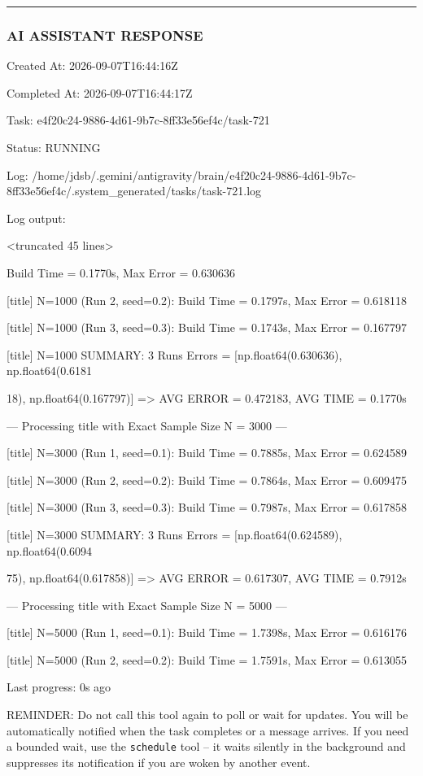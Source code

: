 \documentclass[11pt,a4paper]{article}
\begin{document}
\hrule

\subsubsection{AI ASSISTANT RESPONSE}

Created At: 2026-09-07T16:44:16Z

Completed At: 2026-09-07T16:44:17Z

Task: e4f20c24-9886-4d61-9b7c-8ff33e56ef4c/task-721

Status: RUNNING

Log: /home/jdsb/.gemini/antigravity/brain/e4f20c24-9886-4d61-9b7c-8ff33e56ef4c/.system\_generated/tasks/task-721.log

Log output:

<truncated 45 lines>

Build Time = 0.1770s, Max Error = 0.630636

[title] N=1000 (Run 2, seed=0.2): Build Time = 0.1797s, Max Error = 0.618118

[title] N=1000 (Run 3, seed=0.3): Build Time = 0.1743s, Max Error = 0.167797

[title] N=1000 SUMMARY: 3 Runs Errors = [np.float64(0.630636), np.float64(0.6181

18), np.float64(0.167797)] => AVG ERROR = 0.472183, AVG TIME = 0.1770s

--- Processing title with Exact Sample Size N = 3000 ---

[title] N=3000 (Run 1, seed=0.1): Build Time = 0.7885s, Max Error = 0.624589

[title] N=3000 (Run 2, seed=0.2): Build Time = 0.7864s, Max Error = 0.609475

[title] N=3000 (Run 3, seed=0.3): Build Time = 0.7987s, Max Error = 0.617858

[title] N=3000 SUMMARY: 3 Runs Errors = [np.float64(0.624589), np.float64(0.6094

75), np.float64(0.617858)] => AVG ERROR = 0.617307, AVG TIME = 0.7912s

--- Processing title with Exact Sample Size N = 5000 ---

[title] N=5000 (Run 1, seed=0.1): Build Time = 1.7398s, Max Error = 0.616176

[title] N=5000 (Run 2, seed=0.2): Build Time = 1.7591s, Max Error = 0.613055


Last progress: 0s ago



REMINDER: Do not call this tool again to poll or wait for updates. You will be automatically notified when the task completes or a message arrives. If you need a bounded wait, use the \texttt{schedule} tool -- it waits silently in the background and suppresses its notification if you are woken by another event.
\end{document}
